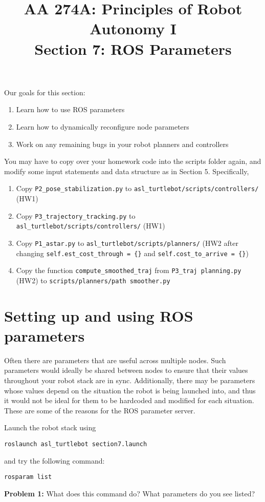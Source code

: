 \documentclass{article}
\title{AA 274A: Principles of Robot Autonomy I \\ Section 7: ROS Parameters}
\date{}
\begin{document}
\maketitle
\pagestyle{fancy}

Our goals for this section: \begin{enumerate}
	\item Learn how to use ROS parameters
    \item Learn how to dynamically reconfigure node parameters
    \item Work on any remaining bugs in your robot planners and controllers
\end{enumerate}
You may have to copy over your homework code into the scripts folder again, and modify some input statements and data structure as in Section 5. Specifically,
\begin{enumerate}
    \item Copy \texttt{P2\_pose\_stabilization.py} to \texttt{asl\_turtlebot/scripts/controllers/} (HW1)
    \item Copy \texttt{P3\_trajectory\_tracking.py} to \texttt{asl\_turtlebot/scripts/controllers/} (HW1)
    \item Copy \texttt{P1\_astar.py} to \texttt{asl\_turtlebot/scripts/planners/} (HW2 after changing 
\texttt{self.est\_cost\_through = \{\}} and \texttt{self.cost\_to\_arrive = \{\}})
    \item Copy the function \texttt{compute\_smoothed\_traj} from \texttt{P3\_traj planning.py} (HW2) to \texttt{scripts/planners/path smoother.py}
\end{enumerate}

\section{Setting up and using ROS parameters}
Often there are parameters that are useful across multiple nodes. Such parameters would ideally be shared between nodes to ensure that their values throughout your robot stack are in sync. Additionally, there may be parameters whose values depend on the situation the robot is being launched into, and thus it would not be ideal for them to be hardcoded and modified for each situation. These are some of the reasons for the ROS parameter server.

Launch the robot stack using 
\begin{lstlisting}
roslaunch asl_turtlebot section7.launch
\end{lstlisting}
and try the following command:
\begin{lstlisting}
rosparam list
\end{lstlisting}
\textbf{Problem 1:} What does this command do? What parameters do you see listed?
\end{document}
